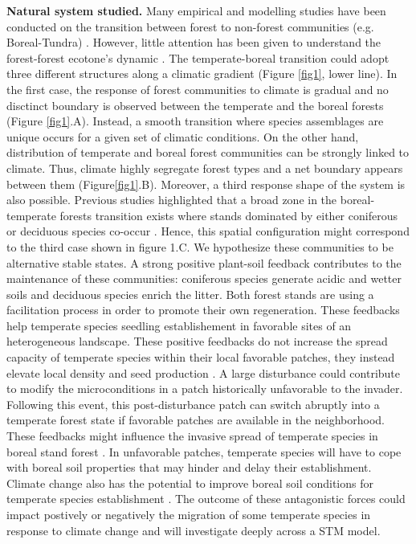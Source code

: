 \textbf{Natural system studied.} Many empirical and modelling studies have
been conducted on the transition between forest to non-forest communities
(e.g. Boreal-Tundra) \cite{Scheffer2012,Scheffer2001,Hirota2011,Messaoud2007}.
However, little attention has been given to understand the forest-forest
ecotone's dynamic \cite{Goldblum2010,Graignic2013,Messaoud2007}.  The
temperate-boreal transition could adopt three different structures along a
climatic gradient (Figure \ref{fig1}, lower line). In the first case, the
response of forest communities to climate is gradual and no disctinct boundary
is observed between the temperate and the boreal forests (Figure
\ref{fig1}.A). Instead, a smooth transition where species assemblages are
unique occurs for a given set of climatic conditions. On the other hand,
distribution of temperate and boreal forest communities can be strongly linked
to climate. Thus, climate highly segregate  forest types and a net boundary
appears between them (Figure\ref{fig1}.B).  Moreover, a third response shape
of the system is also possible. Previous studies highlighted that a broad zone
in the boreal- temperate forests transition exists where stands dominated by
either coniferous or deciduous species co-occur
\cite{Goldblum2010,Fisichelli2013}. Hence, this spatial configuration might
correspond to the third case shown in figure 1.C. We hypothesize these
communities to be alternative stable states. A strong positive plant-soil
feedback contributes to the maintenance of these communities: coniferous
species generate acidic and wetter soils and deciduous species enrich the
litter. Both forest stands are using a facilitation process in order to
promote their own regeneration.  These feedbacks help temperate species
seedling establishement in favorable sites of an heterogeneous landscape.
These positive feedbacks do not increase the spread capacity of temperate
species within their local favorable patches, they instead elevate local
density and seed production \cite{Levine2006}. A large disturbance could
contribute to modify the microconditions in a patch historically unfavorable
to the invader. Following this event, this post-disturbance patch can switch
abruptly into a temperate forest state if favorable patches are available in
the neighborhood. These  feedbacks might influence the invasive spread of
temperate species in boreal stand forest \cite{Levine2006}. In unfavorable
patches, temperate species will have to cope with boreal soil properties that
may hinder and delay their establishment. Climate change also has the
potential to improve boreal soil conditions for temperate species
establishment \cite{Lafleur2010}. The outcome of these antagonistic forces
could impact postively or negatively the migration of some temperate species
in response to climate change and will investigate deeply across a STM model. 

